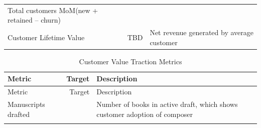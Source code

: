 \documentclass[10pt,openany]{book}
\begin{document}
\begin{longtable}[]{@{}lrl@{}}
\begin{minipage}[t]{0.48\columnwidth}
Total customers MoM(new + retained -- churn)\strut
\end{minipage}\tabularnewline
\begin{minipage}[t]{0.35\columnwidth}\raggedright
Customer Lifetime Value\strut
\end{minipage} & \begin{minipage}[t]{0.08\columnwidth}\raggedleft
TBD\strut
\end{minipage} & \begin{minipage}[t]{0.48\columnwidth}\raggedright
Net revenue generated by average customer\strut
\end{minipage}\tabularnewline
\bottomrule
\end{longtable}

\begin{longtable}[]{@{}lrl@{}}
\caption{Customer Value Traction Metrics}\tabularnewline
\toprule
\begin{minipage}[b]{0.35\columnwidth}\raggedright
Metric\strut
\end{minipage} & \begin{minipage}[b]{0.08\columnwidth}\raggedleft
Target\strut
\end{minipage} & \begin{minipage}[b]{0.48\columnwidth}\raggedright
Description\strut
\end{minipage}\tabularnewline
\midrule
\endfirsthead
\toprule
\begin{minipage}[b]{0.35\columnwidth}\raggedright
Metric\strut
\end{minipage} & \begin{minipage}[b]{0.08\columnwidth}\raggedleft
Target\strut
\end{minipage} & \begin{minipage}[b]{0.48\columnwidth}\raggedright
Description\strut
\end{minipage}\tabularnewline
\midrule
\endhead
\begin{minipage}[t]{0.35\columnwidth}\raggedright
Manuscripts drafted\strut
\end{minipage} & \begin{minipage}[t]{0.08\columnwidth}\raggedleft
750\strut
\end{minipage} & \begin{minipage}[t]{0.48\columnwidth}\raggedright
Number of books in active draft, which shows customer adoption of
composer\strut
\end{minipage}\tabularnewline
\begin{minipage}[t]{0.35\columnwidth}\raggedright

\end{minipage}
\end{longtable}
\end{document}
